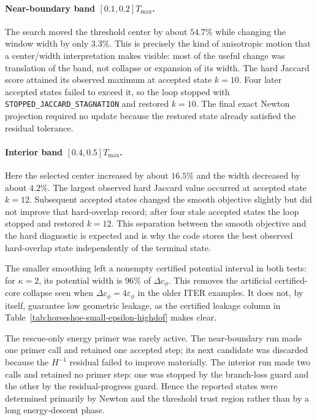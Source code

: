 \paragraph{Near-boundary band $[0.1,0.2]T_{\max}$.}
The search moved the threshold center by about $54.7\%$ while changing the
window width by only $3.3\%$.  This is precisely the kind of anisotropic
motion that a center/width interpretation makes visible: most of the useful
change was translation of the band, not collapse or expansion of its width.
The hard Jaccard score attained its observed maximum at accepted state
$k=10$.  Four later accepted states failed to exceed it, so the loop stopped
with \texttt{STOPPED\_JACCARD\_STAGNATION} and restored $k=10$.  The final
exact Newton projection required no update because the restored state already
satisfied the residual tolerance.

\paragraph{Interior band $[0.4,0.5]T_{\max}$.}
Here the selected center increased by about $16.5\%$ and the width decreased
by about $4.2\%$.  The largest observed hard Jaccard value occurred at
accepted state $k=12$.  Subsequent accepted states changed the smooth
objective slightly but did not improve that hard-overlap record; after four
stale accepted states the loop stopped and restored $k=12$.  This separation
between the smooth objective and the hard diagnostic is expected and is why
the code stores the best observed hard-overlap state independently of the
terminal state.

The smaller smoothing left a nonempty certified potential interval in both
tests: for $\kappa=2$, its potential width is $96\%$ of
$\Delta c_\phi$.  This removes the artificial certified-core collapse seen
when $\Delta c_\phi=4\varepsilon_\phi$ in the older ITER examples.  It does
not, by itself, guarantee low geometric leakage, as the certified leakage
column in Table~\ref{tab:horseshoe-small-epsilon-highdof} makes clear.

The rescue-only energy primer was rarely active.  The near-boundary run made
one primer call and retained one accepted step; its next candidate was
discarded because the $H^{-1}$ residual failed to improve materially.  The
interior run made two calls and retained no primer step: one was stopped by
the branch-loss guard and the other by the residual-progress guard.  Hence
the reported states were determined primarily by Newton and the threshold
trust region rather than by a long energy-descent phase.

